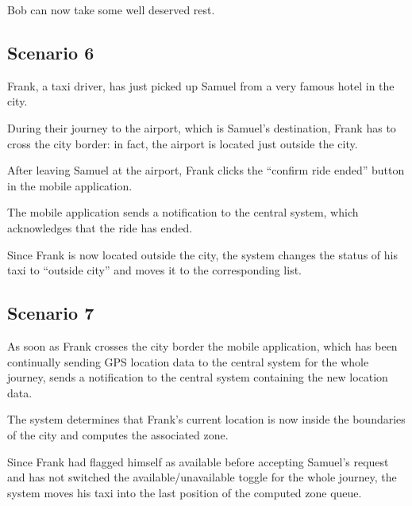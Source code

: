 Bob can now take some well deserved rest.


\subsection{Scenario 6}
Frank, a taxi driver, has just picked up Samuel from a very famous hotel in the city.

During their journey to the airport, which is Samuel's destination, Frank has to cross the city border: in fact, the airport is located just outside the city.

After leaving Samuel at the airport, Frank clicks the ``confirm ride ended'' button in the mobile application.

The mobile application sends a notification to the central system, which acknowledges that the ride has ended. 

Since Frank is now located outside the city, the system changes the status of his taxi to ``outside city'' and moves it to the corresponding list.


\subsection{Scenario 7}
As soon as Frank crosses the city border the mobile application, which has been continually sending GPS location data to the central system for the whole journey, sends a notification to the central system containing the new location data.

The system determines that Frank's current location is now inside the boundaries of the city and computes the associated zone.

Since Frank had flagged himself as available before accepting Samuel's request and has not switched the available/unavailable toggle for the whole journey, the system moves his taxi into the last position of the computed zone queue.
